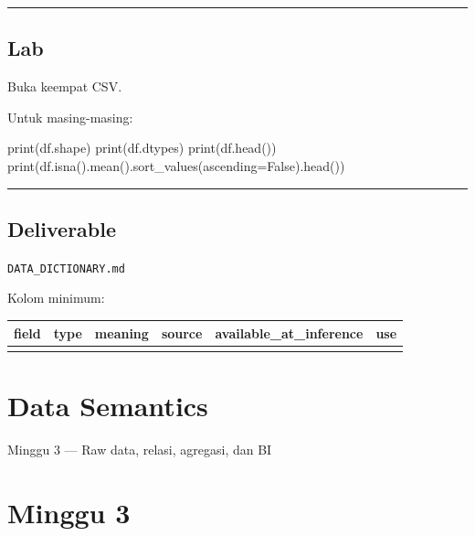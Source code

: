 \documentclass[
  indonesian,
  letterpaper,
  DIV=11,
  numbers=noendperiod]{scrreprt}
\newenvironment{Shaded}{\begin{snugshade}}{\end{snugshade}}
\newcommand{\BuiltInTok}[1]{\textcolor[rgb]{0.00,0.23,0.31}{#1}}
\newcommand{\NormalTok}[1]{\textcolor[rgb]{0.00,0.23,0.31}{#1}}
\newcommand{\OperatorTok}[1]{\textcolor[rgb]{0.37,0.37,0.37}{#1}}
\newcommand{\VariableTok}[1]{\textcolor[rgb]{0.07,0.07,0.07}{#1}}
\newcounter{none} %
\begin{document}
\begin{center}\rule{0.5\linewidth}{0.5pt}\end{center}

\section{Lab}\label{lab-1}

Buka keempat CSV.

Untuk masing-masing:

\begin{Shaded}
\begin{Highlighting}[]
\BuiltInTok{print}\NormalTok{(df.shape)}
\BuiltInTok{print}\NormalTok{(df.dtypes)}
\BuiltInTok{print}\NormalTok{(df.head())}
\BuiltInTok{print}\NormalTok{(df.isna().mean().sort\_values(ascending}\OperatorTok{=}\VariableTok{False}\NormalTok{).head())}
\end{Highlighting}
\end{Shaded}

\begin{center}\rule{0.5\linewidth}{0.5pt}\end{center}

\section{Deliverable}\label{deliverable}

\texttt{DATA\_DICTIONARY.md}

Kolom minimum:

{\def\LTcaptype{none} %
\begin{longtable}[]{@{}llllll@{}}
\toprule\noalign{}
field & type & meaning & source & available\_at\_inference & use \\
\midrule\noalign{}
\endhead
\bottomrule\noalign{}
\endlastfoot
\end{longtable}
}

\chapter{Data Semantics}\label{data-semantics}

Minggu 3 --- Raw data, relasi, agregasi, dan BI

\hfill\break

\chapter{Minggu 3}\label{minggu-3}
\end{document}
